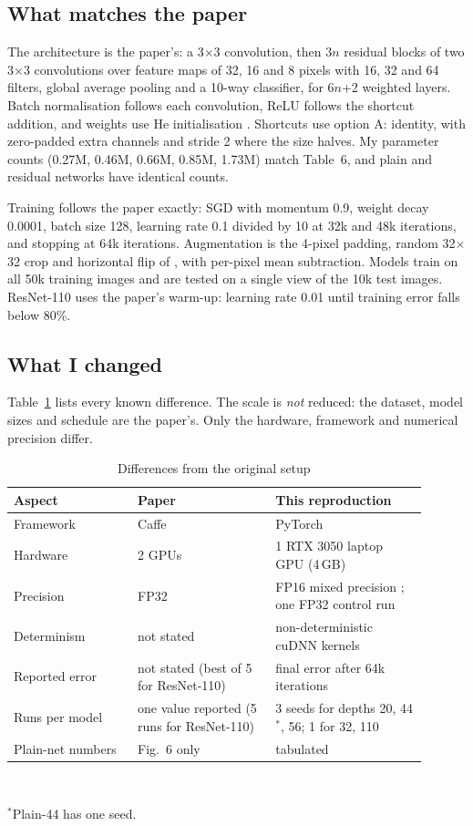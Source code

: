 \documentclass[conference]{IEEEtran}
\begin{document}
\subsection{What matches the paper}
The architecture is the paper's: a 3$\times$3 convolution, then $3n$ residual blocks of two 3$\times$3 convolutions over feature maps of 32, 16 and 8 pixels with 16, 32 and 64 filters, global average pooling and a 10-way classifier, for 6$n$+2 weighted layers. Batch normalisation \cite{ioffe2015batch} follows each convolution, ReLU follows the shortcut addition, and weights use He initialisation \cite{he2015delving}. Shortcuts use option A: identity, with zero-padded extra channels and stride 2 where the size halves. My parameter counts (0.27M, 0.46M, 0.66M, 0.85M, 1.73M) match Table~6, and plain and residual networks have identical counts.

Training follows the paper exactly: SGD with momentum 0.9, weight decay 0.0001, batch size 128, learning rate 0.1 divided by 10 at 32k and 48k iterations, and stopping at 64k iterations. Augmentation is the 4-pixel padding, random 32$\times$32 crop and horizontal flip of \cite{lee2015dsn}, with per-pixel mean subtraction. Models train on all 50k training images and are tested on a single view of the 10k test images. ResNet-110 uses the paper's warm-up: learning rate 0.01 until training error falls below 80\%.

\subsection{What I changed}
Table~\ref{tab:diff} lists every known difference. The scale is \emph{not} reduced: the dataset, model sizes and schedule are the paper's. Only the hardware, framework and numerical precision differ.

\begin{table}[t]
\caption{Differences from the original setup}
\label{tab:diff}
\centering
\small
\begin{tabular}{@{}p{0.27\linewidth}p{0.3\linewidth}p{0.33\linewidth}@{}}
\toprule
Aspect & Paper & This reproduction \\
\midrule
Framework & Caffe & PyTorch \\
Hardware & 2 GPUs & 1 RTX 3050 laptop GPU (4\,GB) \\
Precision & FP32 & FP16 mixed precision \cite{micikevicius2018mixed}; one FP32 control run \\
Determinism & not stated & non-deterministic cuDNN kernels \\
Reported error & not stated (best of 5 for ResNet-110) & final error after 64k iterations \\
Runs per model & one value reported (5 runs for ResNet-110) & 3 seeds for depths 20, 44$^{*}$, 56; 1 for 32, 110 \\
Plain-net numbers & Fig.~6 only & tabulated \\
\bottomrule
\end{tabular}\\[2pt]
\raggedright\footnotesize $^{*}$Plain-44 has one seed.
\end{table}
\end{document}

